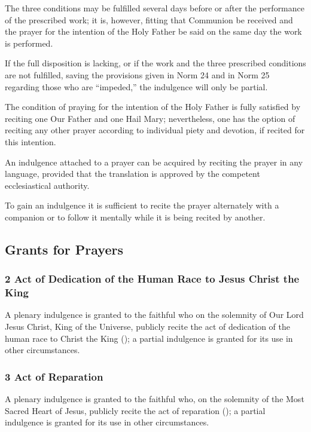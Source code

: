  The three conditions may be fulfilled several days before or after the performance of the prescribed work;
it is, however, fitting that Communion be received and the prayer for the intention of the Holy Father be said on the same day the work is performed.

 If the full disposition is lacking, or if the work and the three prescribed conditions are not fulfilled, saving the provisions given in Norm 24 and in Norm 25 regarding those who are ``impeded,'' the indulgence will only be partial.

 The condition of praying for the intention of the Holy Father is fully satisfied by reciting one Our Father and one Hail Mary;
nevertheless, one has the option of reciting any other prayer according to individual piety and devotion, if recited for this intention.

 An indulgence attached to a prayer can be acquired by reciting the prayer in any language, provided that the translation is approved by the competent ecclesiastical authority.

 To gain an indulgence it is sufficient to recite the prayer alternately with a companion or to follow it mentally while it is being recited by another.

\subsection{Grants for Prayers}
\newcommand{\grant}[2]{\subsubsection*{#1 #2}}
\newcommand{\subgrant}[1]{\sectionsign{}#1.}
\newcommand{\subsubgrant}[1]{#1\degreesign{}}
\hypertarget{grant2}{\grant{2}{Act of Dedication of the Human Race to Jesus Christ the King}}
A plenary indulgence is granted to the faithful who on the solemnity of Our Lord Jesus Christ, King of the Universe, publicly recite the act of dedication of the human race to Christ the King ();
a partial indulgence is granted for its use in other circumstances.

\hypertarget{grant3}{\grant{3}{Act of Reparation}}
A plenary indulgence is granted to the faithful who, on the solemnity of the Most Sacred Heart of Jesus, publicly recite the act of reparation (); a partial indulgence is granted for its use in other circumstances.


